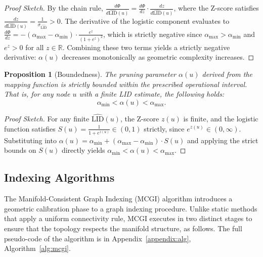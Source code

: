 \documentclass{article}
\theoremstyle{plain}
\newtheorem{proposition}[theorem]{Proposition}
\theoremstyle{definition}
\theoremstyle{remark}
\newcommand{\don}[1]{\textcolor{blue}{[Dongfang: #1]}}
\begin{document}
\begin{proof}[Proof Sketch]
By the chain rule, $\frac{d\Phi}{d\widehat{\text{LID}}(u)} = \frac{d\Phi}{dz} \cdot \frac{dz}{d\widehat{\text{LID}}(u)}$, where the Z-score satisfies $\frac{dz}{d\widehat{\text{LID}}(u)} = \frac{1}{\sigma_{\widehat{\text{LID}}}} > 0$.
The derivative of the logistic component evaluates to $\frac{d\Phi}{dz} = -(\alpha_{\max} - \alpha_{\min}) \cdot \frac{e^z}{(1+e^z)^2}$, which is strictly negative since $\alpha_{\max} > \alpha_{\min}$ and $e^z > 0$ for all $z \in \mathbb{R}$.
Combining these two terms yields a strictly negative derivative: $\alpha(u)$ decreases monotonically as geometric complexity increases.
\end{proof}

\begin{proposition}[Boundedness]
The pruning parameter $\alpha(u)$ derived from the mapping function is strictly bounded within the prescribed operational interval. That is, for any node $u$ with a finite LID estimate, the following holds:
\begin{equation}
    \alpha_{\min} < \alpha(u) < \alpha_{\max}.
\end{equation}
\end{proposition}

\begin{proof}[Proof Sketch]
For any finite $\widehat{\text{LID}}(u)$, the Z-score $z(u)$ is finite, and the logistic function satisfies $S(u) = \frac{1}{1+e^{z(u)}} \in (0, 1)$ strictly, since $e^{z(u)} \in (0, \infty)$.
Substituting into $\alpha(u) = \alpha_{\min} + (\alpha_{\max} - \alpha_{\min}) \cdot S(u)$ and applying the strict bounds on $S(u)$ directly yields $\alpha_{\min} < \alpha(u) < \alpha_{\max}$.
\end{proof}

\subsection{Indexing Algorithms}
\label{subsec:algorithm}


The Manifold-Consistent Graph Indexing (MCGI) algorithm introduces a geometric calibration phase to a graph indexing procedure. Unlike static methods that apply a uniform connectivity rule, MCGI executes in two distinct stages to ensure that the topology respects the manifold structure, as follows. The full pseudo-code of the algorithm is in Appendix~\ref{appendix:alg}, Algorithm~\ref{alg:mcgi}.
\end{document}

